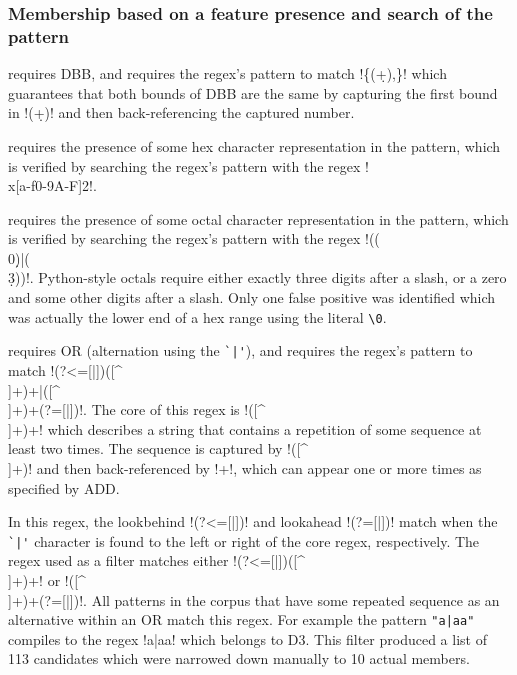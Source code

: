 \subsubsection{Membership based on a feature presence and search of the pattern}
\begin{description} \itemsep -1pt
\item[S3] requires DBB, and requires the regex's pattern to match \cverb!\{(\d+),\1\}! which guarantees that both bounds of DBB are the same by capturing the first bound in \cverb!(\d+)! and then back-referencing the captured number.
\item[T2] requires the presence of some hex character representation in the pattern, which is verified by searching the regex's pattern with the regex \cverb!\\x[a-f0-9A-F]{2}!.
\item[T4] requires the presence of some octal character representation in the pattern, which is verified by searching the regex's pattern with the regex \cverb!((\\0\d*)|(\\\d{3}))!.  Python-style octals require either exactly three digits after a slash, or a zero and some other digits after a slash.  Only one false positive was identified which was actually the lower end of a hex range using the literal \verb!\0!.
\item[D3] requires OR (alternation using the \verb!`|'!), and requires the regex's pattern to match \cverb!(?<=[|])([^ \\]+)\1+|([^ \\]+)\1+(?=[|])!.  The core of this regex is \cverb!([^ \\]+)\1+! which describes a string that contains a repetition of some sequence at least two times.  The sequence is captured by \cverb!([^ \\]+)! and then back-referenced by \cverb!\1+!, which can appear one or more times as specified by ADD.

In this regex, the lookbehind \cverb!(?<=[|])! and lookahead \cverb!(?=[|])! match when the \verb!`|'! character is found to the left or right of the core regex, respectively.  The regex used as a filter matches either \cverb!(?<=[|])([^ \\]+)\1+! or \cverb!([^ \\]+)\1+(?=[|])!.  All patterns in the corpus that have some repeated sequence as an alternative within an OR match this regex.  For example the pattern \verb!"a|aa"! compiles to the regex \cverb!a|aa! which belongs to D3.  This filter produced a list of 113 candidates which were narrowed down manually to 10 actual members.


\end{description}
